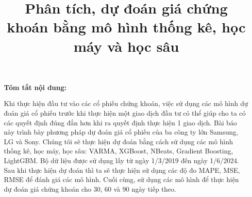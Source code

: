 \documentclass[conference]{IEEEtran}
\begin{document}
\title{Phân tích, dự đoán giá chứng khoán bằng mô hình thống kê, học máy và học sâu}
\author{
    \and
    \and
    \and
    \and
}




\maketitle


\textbf{Tóm tắt nội dung:}

Khi thực hiện đầu tư vào các cổ phiếu chứng khoán, việc sử dụng các mô hình dự đoán giá cổ phiếu trước khi thực hiện một giao dịch đầu tư có thể giúp cho ta có các quyết định đúng đắn hơn khi ra quyết định thực hiện 1 giao dịch. Bài báo này trình bày phương pháp dự đoán giá cổ phiếu của ba công ty lớn Samsung, LG và Sony. Chúng tôi sẽ thực hiện dự đoán bằng cách sử dụng các mô hình thống kê, học máy, học sâu: VARMA, XGBoost, NBeats, Gradient Boosting, LightGBM. Bộ dữ liệu được sử dụng lấy từ ngày 1/3/2019 đến ngày 1/6/2024. Sau khi thực hiện dự đoán thì ta sẽ thực hiện sử dụng các độ đo MAPE, MSE, RMSE để đánh giá các mô hình. Cuối cùng, sử dụng các mô hình để thực hiện dự đoán giá chứng khoán cho 30, 60 và 90 ngày tiếp theo.
\end{document}
